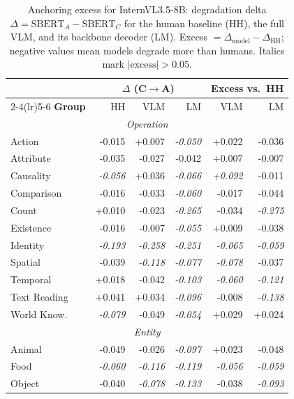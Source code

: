 \begin{table}[ht]
\small\centering
\setlength{\tabcolsep}{4.5pt}
\caption{Anchoring excess for InternVL3.5-8B: degradation delta $\Delta{=}\mathrm{SBERT}_A - \mathrm{SBERT}_C$ for the human baseline (HH), the full VLM, and its backbone decoder (LM). Excess $= \Delta_\text{model} - \Delta_\text{HH}$; negative values mean models degrade more than humans. Italics mark $|\text{excess}|{>}0.05$.}
\label{tab:internvl_anchoring}
\begin{tabular}{lrrr rr}
\toprule
 & \multicolumn{3}{c}{$\Delta$ (C$\to$A)} & \multicolumn{2}{c}{Excess vs.\ HH} \\
\cmidrule(lr){2-4}\cmidrule(lr){5-6}
\textbf{Group} & HH & VLM & LM & VLM & LM \\
\midrule
\multicolumn{6}{c}{\textit{Operation}} \\
\midrule
Action & -0.015 & +0.007 & \textit{-0.050} & +0.022 & -0.036 \\
Attribute & -0.035 & -0.027 & -0.042 & +0.007 & -0.007 \\
Causality & \textit{-0.056} & +0.036 & \textit{-0.066} & \textit{+0.092} & -0.011 \\
Comparison & -0.016 & -0.033 & \textit{-0.060} & -0.017 & -0.044 \\
Count & +0.010 & -0.023 & \textit{-0.265} & -0.034 & \textit{-0.275} \\
Existence & -0.016 & -0.007 & \textit{-0.055} & +0.009 & -0.038 \\
Identity & \textit{-0.193} & \textit{-0.258} & \textit{-0.251} & \textit{-0.065} & \textit{-0.059} \\
Spatial & -0.039 & \textit{-0.118} & \textit{-0.077} & \textit{-0.078} & -0.037 \\
Temporal & +0.018 & -0.042 & \textit{-0.103} & \textit{-0.060} & \textit{-0.121} \\
Text Reading & +0.041 & +0.034 & \textit{-0.096} & -0.008 & \textit{-0.138} \\
World Know. & \textit{-0.079} & -0.049 & \textit{-0.054} & +0.029 & +0.024 \\
\midrule
\multicolumn{6}{c}{\textit{Entity}} \\
\midrule
Animal & -0.049 & -0.026 & \textit{-0.097} & +0.023 & -0.048 \\
Food & \textit{-0.060} & \textit{-0.116} & \textit{-0.119} & \textit{-0.056} & \textit{-0.059} \\
Object & -0.040 & \textit{-0.078} & \textit{-0.133} & -0.038 & \textit{-0.093} \\

\end{tabular}
\end{table}

